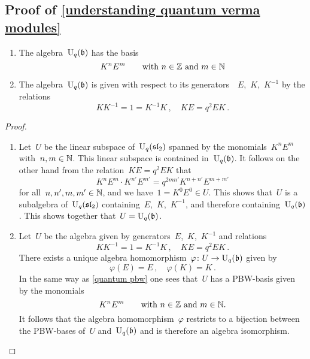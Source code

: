 \documentclass[a4paper, 11pt, oneside]{scrartcl}
\begin{document}
\subsection{Proof of \cref{understanding quantum verma modules}}
\label{proof of understanding quantum verma modules}

\begin{proposition}
  \label{quantum borel}
  \leavevmode
  \begin{enumerate}
    \item
      The algebra~$\operatorname{U}_q(\mathfrak{b})$ has the basis
      \[
        K^n E^m
        \qquad
        \text{with~$n \in \mathbb{Z}$ and~$m \in \mathbb{N}$}
      \]
    \item
      The algebra~$\operatorname{U}_q(\mathfrak{b})$ is given with respect to its generators~~$E$,~$K$,~$K^{-1}$ by the relations
      \[
        K K^{-1} = 1 = K^{-1} K \,,
        \quad
        K E = q^2 E K \,.
      \]
  \end{enumerate}
\end{proposition}

\begin{proof}
  \leavevmode
  \begin{enumerate}
    \item
      Let~$U$ be the linear subspace of~$\operatorname{U}_q(\mathfrak{sl}_2)$ spanned by the monomials~$K^n E^m$ with~$n, m \in \mathbb{N}$.
      This linear subspace is contained in~$\operatorname{U}_q(\mathfrak{b})$.
      It follows on the other hand from the relation~$KE = q^2 EK$ that
      \[
        K^n E^m \cdot K^{n'} E^{m'}
        =
        q^{2 m n'} K^{n + n'} E^{m + m'}
      \]
      for all~$n, n', m, m' \in \mathbb{N}$, and we have~$1 = K^0 E^0 \in U$.
      This shows that~$U$ is a subalgebra of~$\operatorname{U}_q(\mathfrak{sl}_2)$ containing~$E$,~$K$,~$K^{-1}$, and therefore containing~$\operatorname{U}_q(\mathfrak{b})$.
      This shows together that~$U = \operatorname{U}_q(\mathfrak{b})$.
    \item
      Let~$U$ be the algebra given by generators~$E$,~$K$,~$K^{-1}$ and relations
      \[
        K K^{-1} = 1 = K^{-1} K \,,
        \quad
        KE = q^2 EK \,.
      \]
      There exists a unique algebra homomorphism~$\varphi \colon U \to \operatorname{U}_q(\mathfrak{b})$ given by
      \[
        \varphi(E) = E \,,
        \quad
        \varphi(K) = K \,.
      \]
      In the same way as \cref{quantum pbw} one sees that~$U$ has a PBW-basis given by the monomials
      \[
        K^n E^m
        \qquad
        \text{with~$n \in \mathbb{Z}$ and~$m \in \mathbb{N}$.}
      \]
      It follows that the algebra homomorphism~$\varphi$ restricts to a bijection between the PBW-bases of~$U$ and~$\operatorname{U}_q(\mathfrak{b})$ and is therefore an algebra isomorphism.
    \qedhere
  \end{enumerate}
\end{proof}
\end{document}
